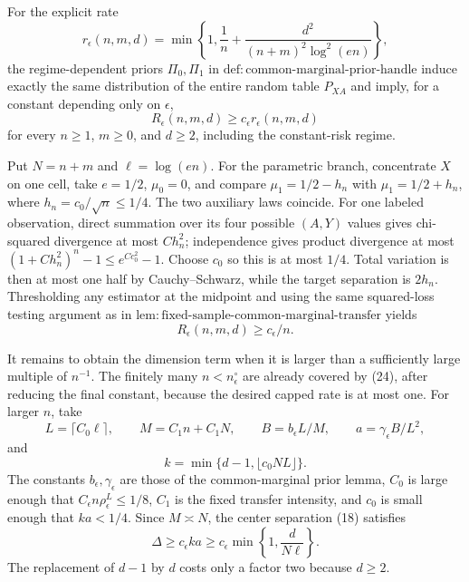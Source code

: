 For the explicit rate
\[
 r_\epsilon(n,m,d)=\min\!\left\{1,\frac1n+\frac{d^2}{(n+m)^2\log^2(en)}\right\},
\]
the regime-dependent priors \(\Pi_0,\Pi_1\) in \(\mathrm{def:common\mbox{-}marginal\mbox{-}prior\mbox{-}handle}\) induce exactly the same distribution of the entire random table \(P_{XA}\) and imply, for a constant depending only on \(\epsilon\),
\[
 R_\epsilon(n,m,d)\ge c_\epsilon r_\epsilon(n,m,d)
\]
for every \(n\ge1\), \(m\ge0\), and \(d\ge2\), including the constant-risk regime.

Put \(N=n+m\) and \(\ell=\log(en)\).  For the parametric branch, concentrate \(X\) on one cell, take \(e=1/2\), \(\mu_0=0\), and compare \(\mu_1=1/2-h_n\) with \(\mu_1=1/2+h_n\), where \(h_n=c_0/\sqrt n\le1/4\).  The two auxiliary laws coincide.  For one labeled observation, direct summation over its four possible \((A,Y)\) values gives chi-squared divergence at most \(C h_n^2\); independence gives product divergence at most \((1+Ch_n^2)^n-1\le e^{Cc_0^2}-1\).  Choose \(c_0\) so this is at most \(1/4\).  Total variation is then at most one half by Cauchy--Schwarz, while the target separation is \(2h_n\).  Thresholding any estimator at the midpoint and using the same squared-loss testing argument as in \(\mathrm{lem:fixed\mbox{-}sample\mbox{-}common\mbox{-}marginal\mbox{-}transfer}\) yields
\[
 R_\epsilon(n,m,d)\ge c_\epsilon/n. \tag{24}
\]

It remains to obtain the dimension term when it is larger than a sufficiently large multiple of \(n^{-1}\).  The finitely many \(n<n_\epsilon^\circ\) are already covered by (24), after reducing the final constant, because the desired capped rate is at most one.  For larger \(n\), take
\[
 L=\lceil C_0\ell\rceil,\qquad
 M=C_1n+C_1N,\qquad
 B=b_\epsilon L/M,\qquad
 a=\gamma_\epsilon B/L^2,
\]
and
\[
 k=\min\{d-1,\lfloor c_0NL\rfloor\}.
\]
The constants \(b_\epsilon,\gamma_\epsilon\) are those of the common-marginal prior lemma, \(C_0\) is large enough that \(C_\epsilon n\rho_\epsilon^L\le1/8\), \(C_1\) is the fixed transfer intensity, and \(c_0\) is small enough that \(ka<1/4\).  Since \(M\asymp N\), the center separation (18) satisfies
\[
 \Delta\ge c_\epsilon ka\ge c_\epsilon\min\!\left\{1,\frac d{N\ell}\right\}. \tag{25}
\]
The replacement of \(d-1\) by \(d\) costs only a factor two because \(d\ge2\).

